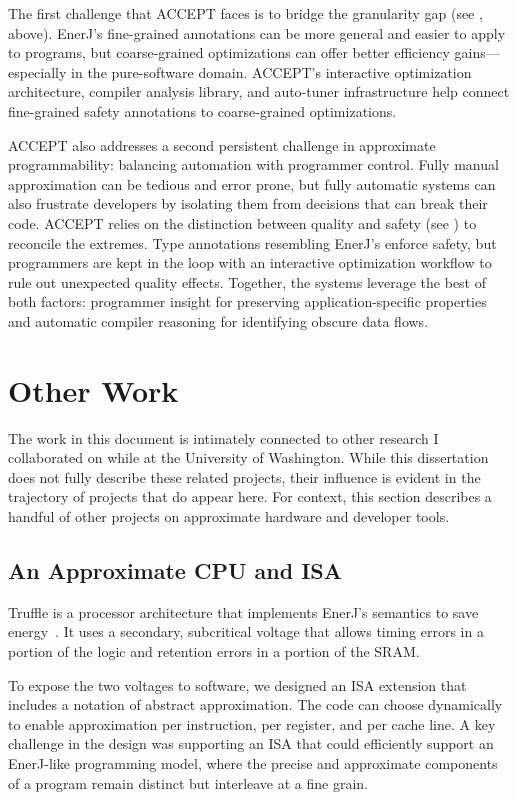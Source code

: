 The first challenge that ACCEPT faces is to bridge the granularity gap (see
, above).
EnerJ's fine-grained annotations can be more general and easier to apply to
programs,
but coarse-grained optimizations can offer better efficiency
gains---especially in the pure-software domain.
ACCEPT's interactive optimization architecture,
compiler analysis library,
and auto-tuner infrastructure help connect fine-grained safety annotations to
coarse-grained optimizations.

ACCEPT also addresses a second persistent challenge in approximate
programmability:
balancing automation with programmer control.
Fully manual approximation can be tedious and error prone,
but fully automatic systems can also frustrate developers by isolating them
from decisions that can break their code.
ACCEPT relies on the distinction between quality and safety (see
) to reconcile the extremes.
Type annotations resembling EnerJ's enforce safety, but programmers are kept
in the loop with an interactive optimization workflow to rule out unexpected
quality effects.
Together, the systems leverage the best of both factors:
programmer insight for preserving application-specific properties
and automatic compiler reasoning for identifying obscure data flows.

\section{Other Work}

The work in this document is intimately connected to other research I
collaborated on while at the University of Washington.
While this dissertation does not fully describe these related projects, their
influence is evident in the trajectory of projects that do appear here.
For context, this section describes a handful of other projects on approximate
hardware and developer tools.


\subsection{An Approximate CPU and ISA}

Truffle is a processor architecture that implements EnerJ's semantics to save
energy~\cite{truffle}. It uses a secondary, subcritical voltage that allows timing errors in
a portion of the logic and retention errors in a portion of the SRAM.

To expose the two voltages to software, we
designed an ISA extension that includes a notation of abstract approximation.
The code can choose dynamically to enable approximation
per instruction, per register, and per cache line.
A key challenge in the design was supporting an ISA that could efficiently
support an EnerJ-like programming model, where the precise and approximate
components of a program remain distinct but interleave at a fine grain.

